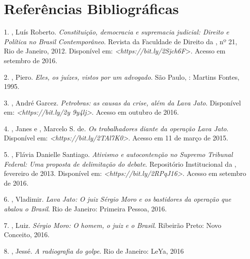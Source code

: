 \section{Referências Bibliográficas}

1. , Luís Roberto. \emph{Constituição, democracia e
supremacia judicial: Direito e Política no Brasil Contemporâneo}.
Revista da Faculdade de Direito da , nº 21, Rio de Janeiro, 2012.
Disponível em:
\emph{\textless{}https://bit.ly/2Sjch6F}\textgreater{}.
Acesso em setembro de 2016.

2. , Piero. \emph{Eles, os juízes, vistos por um advogado}.
São Paulo, : Martins Fontes, 1995.

3. , André Garcez. \emph{Petrobras: as causas da crise, além da
Lava Jato}. Disponível em:
\emph{\textless{}https://bit.ly/2y 9y4lj\textgreater{}}.
Acesso em outubro de 2016.

4. , Janes e , Marcelo S. de. \emph{Os trabalhadores diante da
operação Lava Jato}. Disponível em:
\emph{\textless{}https://bit.ly/2TAl7K0\textgreater{}}.
Acesso em 11 de março de 2015.

5. , Flávia Danielle Santiago. \emph{Ativismo e autocontenção no
Supremo Tribunal Federal: Uma proposta de delimitação do debate}.
Repositório Institucional da , fevereiro de 2013. Disponível em:
\emph{\textless{}https://bit.ly/2RPqJ16\textgreater{}}.
Acesso em setembro de 2016.

6. , Vladimir. \emph{Lava Jato: O juiz Sérgio Moro e os
bastidores da operação que abalou o Brasil}. Rio de Janeiro:
Primeira Pessoa, 2016.

7. , Luiz. \emph{Sérgio Moro: O homem, o juiz e o
Brasil}. Ribeirão Preto: Novo Conceito, 2016.

8. , Jessé. \emph{A radiografia do golpe}. Rio de Janeiro:
LeYa, 2016
